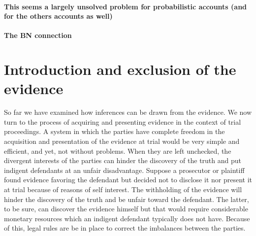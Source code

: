 \documentclass[10pt]{article}
\begin{document}
\paragraph{This seems a largely unsolved problem for probabilistic accounts (and for the others accounts as well)}

\paragraph{The BN connection}


\section{Introduction and exclusion of the evidence}
\label{sec:intexc}

So far we have examined how inferences can be drawn from the evidence.
We now turn to the process of acquiring and presenting evidence in the 
context of trial proceedings. 
A system in which the parties have complete 
 freedom in the acquisition and presentation 
 of the evidence at trial would be very simple and 
 efficient, and yet, not without problems.  
When they are left unchecked, the divergent interests of the parties %
can hinder the discovery of the truth and put indigent defendants at an unfair disadvantage.
Suppose a prosecutor or plaintiff found evidence favoring the defendant but decided not to disclose it nor present it at trial because of reasons of self interest. The withholding of the evidence will hinder the discovery of the truth and be unfair toward the defendant. The latter, to be sure, can discover the evidence himself but that would require considerable monetary resources which an indigent defendant typically does not have. 
Because of this, legal rules are be in place to correct the imbalances between the parties.
\end{document}

